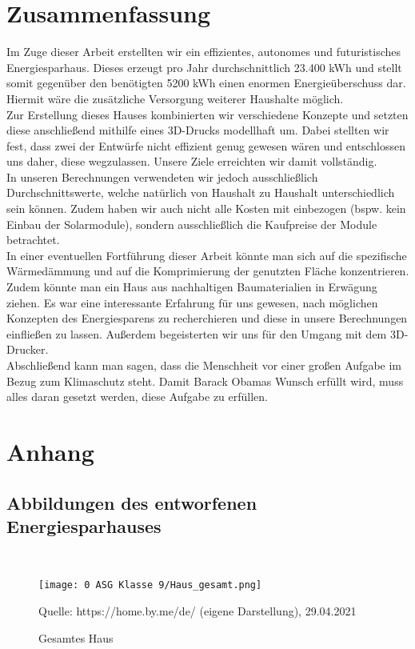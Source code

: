 \section{Zusammenfassung}
Im Zuge dieser Arbeit erstellten wir ein effizientes, autonomes und futuristisches Energiesparhaus. Dieses erzeugt pro Jahr durchschnittlich 23.400 kWh und stellt somit gegenüber den benötigten 5200 kWh einen enormen Energieüberschuss dar.
Hiermit wäre die zusätzliche Versorgung weiterer Haushalte möglich.
\\
Zur Erstellung dieses Hauses kombinierten wir verschiedene Konzepte und setzten diese anschließend mithilfe eines 3D-Drucks modellhaft um. Dabei stellten wir fest, dass zwei der Entwürfe nicht effizient genug
gewesen wären und entschlossen uns daher, diese wegzulassen. Unsere Ziele erreichten wir damit
vollständig. 
\\
In unseren Berechnungen verwendeten wir jedoch ausschließlich Durchschnittswerte, welche natürlich von Haushalt zu Haushalt unterschiedlich sein können. Zudem haben wir auch nicht alle Kosten mit einbezogen (bspw. kein Einbau der Solarmodule), sondern ausschließlich die Kaufpreise der Module betrachtet. 
\\
In einer eventuellen Fortführung dieser Arbeit könnte man sich auf die spezifische
\\
Wärmedämmung und auf die Komprimierung der genutzten Fläche konzentrieren. Zudem könnte
man ein Haus aus nachhaltigen Baumaterialien in Erwägung ziehen.
Es war eine interessante Erfahrung für uns gewesen, nach möglichen Konzepten des
Energiesparens zu recherchieren und diese in unsere Berechnungen einfließen zu lassen.
Außerdem begeisterten wir uns für den Umgang mit dem 3D-Drucker.
\\
Abschließend kann man sagen, dass die Menschheit vor einer großen Aufgabe im Bezug zum
Klimaschutz steht. Damit Barack Obamas Wunsch erfüllt wird, muss alles daran gesetzt werden,
diese Aufgabe zu erfüllen.
\newpage
\section{Anhang}
\par
\subsection{Abbildungen des entworfenen Energiesparhauses}
\textcolor{white}{text}

\begin{figure}[h]
\begin{center}
\texttt{[image: 0 ASG Klasse 9/Haus\_gesamt.png]}
\par
\tiny{Quelle: https://home.by.me/de/ (eigene Darstellung), 29.04.2021}

\caption{Gesamtes Haus}


\end{center}
\end{figure}

